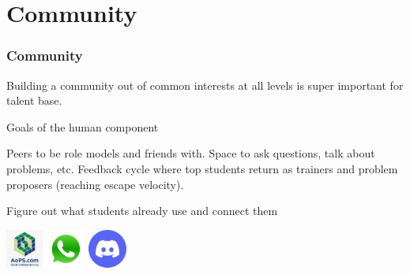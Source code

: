 \documentclass[10pt]{beamer}
\begin{document}
\section{Community}
\begin{frame}
  \frametitle{Community}
  Building a community out of common interests
  at all levels is super important for talent base.
  \begin{block}{Goals of the human component}
  \begin{itemize}
    \ii Peers to be role models and friends with.
    \ii Space to ask questions, talk about problems, etc.
    \ii Feedback cycle where top students return as trainers and problem proposers
    (reaching escape velocity).
  \end{itemize}
  \end{block}
  \pause
  \begin{exampleblock}{Figure out what students already use and connect them}
    \begin{center}
      \includegraphics[height=0.5in]{logo-aops.png}
      \includegraphics[height=0.5in]{logo-whatsapp.png}
      \includegraphics[height=0.5in]{logo-discord.png}
    \end{center}
  \end{exampleblock}
\end{frame}
\end{document}

